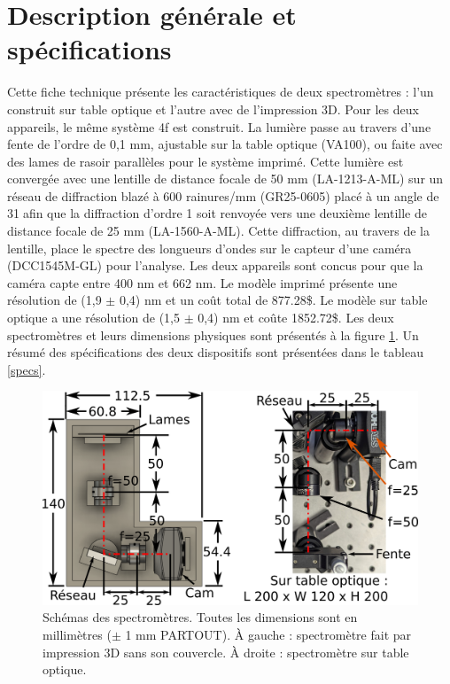 \documentclass[11pt,letterpaper]{article}
\begin{document}
\section{Description générale et spécifications}

Cette fiche technique présente les caractéristiques de deux spectromètres : l'un construit sur 
table optique et l'autre avec de l'impression 3D. Pour les deux appareils, le même système 4f
est construit. La lumière passe au travers d'une fente de l'ordre de 0,1 mm, 
ajustable sur la table optique (VA100), ou faite avec des lames de rasoir parallèles pour le
système imprimé. Cette lumière est convergée avec une lentille de distance focale de 50 mm 
(LA-1213-A-ML) sur un réseau de diffraction blazé à 600 rainures/mm (GR25-0605) placé à un
angle de 31\degree $\;$afin que la diffraction d'ordre 1 soit renvoyée vers une deuxième lentille de distance focale
de 25 mm (LA-1560-A-ML). Cette diffraction, au travers de la lentille, place le spectre des 
longueurs d'ondes sur le capteur d'une caméra (DCC1545M-GL) pour l'analyse. Les deux appareils
sont concus pour que la caméra capte entre 400 nm et 662 nm. Le modèle imprimé présente une
résolution de (1,9 $\pm$ 0,4) nm et un coût total de 877.28\$. Le modèle sur
table optique a une résolution de (1,5 $\pm$ 0,4) nm et coûte 1852.72\$. Les
deux spectromètres et leurs dimensions physiques sont présentés à la figure 
\ref{schema_spectros}. Un résumé des spécifications des deux dispositifs sont présentées dans le tableau \ref{specs}. 


\begin{figure}[H]
  \centering
  \includegraphics[scale=1.75]{schema_spectros.png}
  \caption{Schémas des spectromètres. Toutes les dimensions sont en millimètres ($\pm$ 1 mm PARTOUT). À gauche : spectromètre fait par impression 3D sans son couvercle. À droite : spectromètre sur table optique.}
  \label{schema_spectros}
\end{figure}
\end{document}
